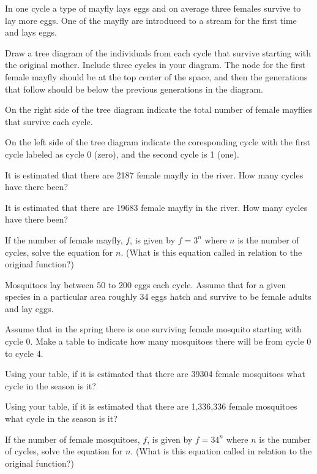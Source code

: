 \begin{problem}
\clearpage

\item In one cycle a type of mayfly lays eggs and on average three
  females survive to lay more eggs. One of the mayfly are introduced
  to a stream for the first time and lays eggs.
  \begin{subproblem}
  \item Draw a tree diagram of the individuals from each cycle that
    survive starting with the original mother. Include three cycles in
    your diagram. The node for the first female mayfly should be at
    the top center of the space, and then the generations that follow
    should be below the previous generations in the diagram.  

    \vfill

  \item On the right side of the tree diagram indicate the total number
    of female mayflies that survive each cycle.
  \item On the left side of the tree diagram indicate the coresponding cycle with the
    first cycle labeled as cycle 0 (zero), and the second cycle is 1 (one).
  \item It is estimated that there are 2187 female mayfly in the river. How
    many cycles have there been?
    \vspace{3em}
  \item It is estimated that there are 19683 female mayfly in the river. How
    many cycles have there been?
    \vspace{3em}
  \item If the number of female mayfly, $f$, is given by $f=3^n$ where
    $n$ is the number of cycles, solve the equation for $n$. (What is
    this equation called in relation to the original function?)
    \vspace{3em}
  \end{subproblem}

\clearpage

\item Mosquitoes lay between 50 to 200 eggs each cycle. Assume that
  for a given species in a particular area roughly 34 eggs hatch and
  survive to be female adults and lay eggs.
  \begin{subproblem}
  \item Assume that in the spring there is one surviving female
    mosquito starting with cycle 0. Make a table to indicate how many
    mosquitoes there will be from cycle 0 to cycle 4.
    \vfill
  \item Using your table, if it is estimated that there are 39304 female
    mosquitoes what cycle in the season is it?
    \vfill
  \item Using your table, if it is estimated that there are 1,336,336 female
    mosquitoes what cycle in the season is it?
    \vfill
  \item If the number of female mosquitoes, $f$, is given by $f=34^n$ where
    $n$ is the number of cycles, solve the equation for $n$. (What is
    this equation called in relation to the original function?)
    \vspace{3em}
  \end{subproblem}


\end{problem}
